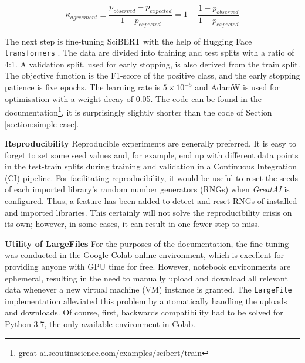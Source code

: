 \begin{equation} \label{equation:kappa}
\kappa_{agreement} \equiv \frac{p_{observed} - p_{expected}}{1 - p_{expected}} = 1 - \frac{1 - p_{observed}}{1 - p_{expected}} 
\end{equation}

The next step is fine-tuning SciBERT with the help of Hugging Face \texttt{transformers} \cite{wolf2019huggingface}. The data are divided into training and test splits with a ratio of 4:1. A validation split, used for early stopping, is also derived from the train split. The objective function is the F1-score of the positive class, and the early stopping patience is five epochs. The learning rate is $5 \times 10^{-5}$ and AdamW \cite{loshchilov2017decoupled} is used for optimisation with a weight decay of 0.05. The code can be found in the documentation\footnote{\href{https://great-ai.scoutinscience.com/examples/scibert/train/}{great-ai.scoutinscience.com/examples/scibert/train}}, it is surprisingly slightly shorter than the code of Section \ref{section:simple-case}.

\begin{displayquote}
\textbf{Reproducibility} Reproducible experiments are generally preferred. It is easy to forget to set some seed values and, for example, end up with different data points in the test-train splits during training and validation in a Continuous Integration (CI) pipeline. For facilitating reproducibility, it would be useful to reset the seeds of each imported library's random number generators (RNGs) when \textit{GreatAI} is configured. Thus, a feature has been added to detect and reset RNGs of installed and imported libraries. This certainly will not solve the reproducibility crisis \cite{hutson2018artificial} on its own; however, in some cases, it can result in one fewer step to miss.
\end{displayquote}

\begin{displayquote}
\textbf{Utility of LargeFiles} For the purposes of the documentation, the fine-tuning was conducted in the Google Colab online environment, which is excellent for providing anyone with GPU time for free. However, notebook environments are ephemeral, resulting in the need to manually upload and download all relevant data whenever a new virtual machine (VM) instance is granted. The \texttt{LargeFile} implementation alleviated this problem by automatically handling the uploads and downloads. Of course, first, backwards compatibility had to be solved for Python 3.7, the only available environment in Colab.
\end{displayquote}

